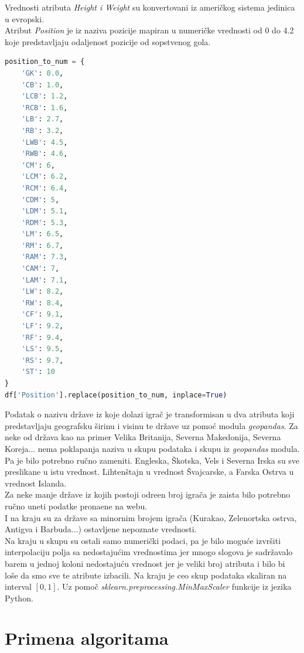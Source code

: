 \documentclass[a4paper, 11pt]{article}
\begin{document}
Vrednosti atributa \emph{Height i Weight} su konvertovani iz ameri\v{c}kog sistema jedinica
u evropski. \\
Atribut \emph{Position} je iz naziva pozicije mapiran u numeri\v{c}ke vrednosti od 0 do 4.2
koje predstavljaju odaljenost pozicije od sopstvenog gola.

\begin{lstlisting}[language=Python] 
position_to_num = {
    'GK': 0.0,
    'CB': 1.0,
    'LCB': 1.2,
    'RCB': 1.6,
    'LB': 2.7,
    'RB': 3.2,
    'LWB': 4.5,
    'RWB': 4.6,
    'CM': 6,
    'LCM': 6.2,
    'RCM': 6.4,
    'CDM': 5,
    'LDM': 5.1,
    'RDM': 5.3,
    'LM': 6.5,
    'RM': 6.7,
    'RAM': 7.3,
    'CAM': 7,
    'LAM': 7.1,
    'LW': 8.2,
    'RW': 8.4,
    'CF': 9.1,
    'LF': 9.2,
    'RF': 9.4,
    'LS': 9.5,
    'RS': 9.7,
    'ST': 10
}
df['Position'].replace(position_to_num, inplace=True)
\end{lstlisting}

Podatak o nazivu dr\v{z}ave iz koje dolazi igra\v{c} je transformisan u dva atributa
koji predstavljaju geografsku \v{s}irinu i visinu te dr\v{z}ave uz pomo\'{c}
modula \emph{geopandas}. 
Za neke od dr\v{z}ava kao na primer Velika Britanija, Severna Makedonija, Severna Koreja...
nema poklapanja naziva u skupu podataka i skupu iz \emph{geopandas} modula. Pa je bilo potrebno
ru\v{c}no zameniti. 
Engleska, \v{S}kotska, Vels i Severna Irska su sve preslikane u istu vrednost.
Lihten\v{s}tajn u vrednost  \v{S}vajcarske, a Farska Ostrva u vrednost Islanda.
\\
Za neke manje dr\v{z}ave iz kojih postoji odre\dj{}en broj igra\v{c}a je zaista bilo
potrebno ru\v{c}no uneti podatke prona\dj{}ene na webu.
\\
I na kraju su za dr\v{z}ave sa minornim brojem igra\v{c}a (Kurakao, Zelenortska ostrva,
Antigva i Barbuda...) ostavljene nepoznate vrednosti.
\\

Na kraju u skupu su ostali samo numeri\v{c}ki podaci, pa je bilo mogu\'{c}e
izvr\v{s}iti interpolaciju polja sa nedostaju\'{c}im vrednostima jer mnogo
slogova je sadr\v{z}avalo barem u jednoj koloni nedostaju\'{c}u vrednost
jer je veliki broj atributa i 
bilo bi lo\v{s}e da smo sve te atribute izbacili.
Na kraju je ceo skup podataka skaliran na interval  
$\left[ 0,1 \right]$. Uz pomo\v{c} \emph{sklearn.preprocessing.MinMaxScaler} funkcije
iz jezika Python.




\section{Primena algoritama}
\end{document}
